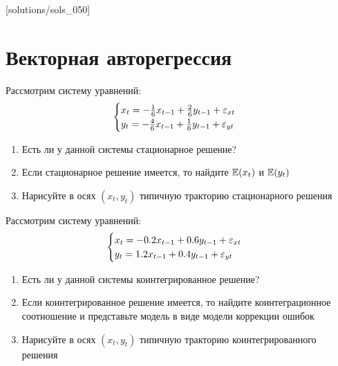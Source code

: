 [solutions/sols_050]

\chapter{Векторная авторегрессия}



\begin{problem}
Рассмотрим систему уравнений:
\[
\begin{cases}
x_t = -\frac{1}{6}x_{t-1} + \frac{2}{6}y_{t-1} + \varepsilon_{xt} \\
y_t = -\frac{4}{6}x_{t-1} + \frac{1}{6}y_{t-1} + \varepsilon_{yt}
\end{cases}
\]
\begin{enumerate}
\item Есть ли у данной системы стационарное решение?
\item Если стационарное решение имеется, то найдите $\mathbb{E}(x_t)$ и $\mathbb{E}(y_t)$
\item Нарисуйте в осях $(x_t, y_t)$ типичную тракторию стационарного решения
\end{enumerate}

\begin{sol}

\end{sol}
\end{problem}


\begin{problem}
Рассмотрим систему уравнений:
\[
\begin{cases}
x_t = -0.2x_{t-1} + 0.6y_{t-1} + \varepsilon_{xt} \\
y_t = 1.2x_{t-1} + 0.4y_{t-1} + \varepsilon_{yt}
\end{cases}
\]
\begin{enumerate}
\item Есть ли у данной системы коинтегрированное решение?
\item Если коинтегрированное решение имеется, то найдите коинтеграционное соотношение и представьте модель в виде модели коррекции ошибок
\item Нарисуйте в осях $(x_t, y_t)$ типичную тракторию коинтегрированного решения
\end{enumerate}

\begin{sol}

\end{sol}
\end{problem}




